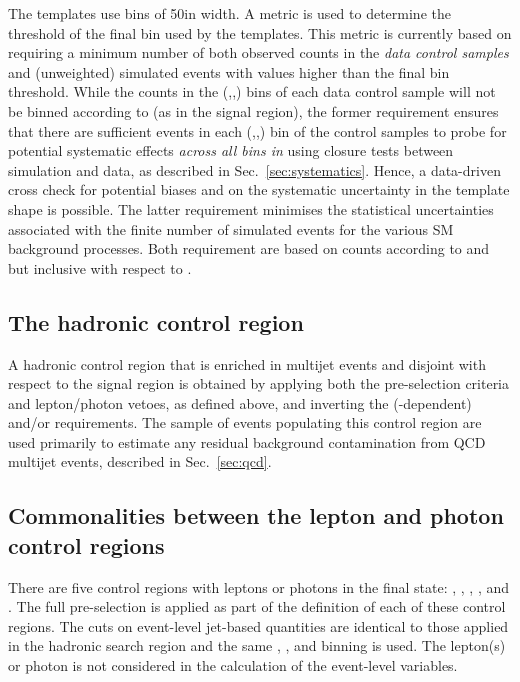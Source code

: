The templates use \mht bins of 50\gev in width. A metric is used to
determine the threshold of the final \mht bin used by the
templates. This metric is currently based on requiring a minimum
number of both observed counts in the {\it data control samples} and
(unweighted) simulated events with \mht values higher than the final
bin threshold. While the counts in the (\njet,\nb,\HT) bins of each
data control sample will not be binned according to \mht (as in the
signal region), the former requirement ensures that there are
sufficient events in each (\njet,\nb,\HT) bin of the control samples
to probe for potential systematic effects {\it across all bins in
  \mht} using closure tests between simulation and data, as described
in Sec.~\ref{sec:systematics}. Hence, a data-driven cross check for
potential biases and on the systematic uncertainty in the template
shape is possible. The latter requirement minimises the statistical
uncertainties associated with the finite number of simulated events
for the various SM background processes. Both requirement are based on
counts according to \njet and \nb but inclusive with respect to \nb.

\subsection{The hadronic control region}

A hadronic control region that is enriched in multijet events and
disjoint with respect to the signal region is obtained by applying
both the pre-selection criteria and lepton/photon vetoes, as defined
above, and inverting the (\HT-dependent) \alphat and/or \mhtmet
requirements. 
The sample of events populating this control region are used primarily
to estimate any residual background contamination from QCD multijet
events, described in Sec.~\ref{sec:qcd}.

\subsection{Commonalities between the lepton and photon control
  regions}

There are five control regions with leptons or photons in the final
state: \mj, \mmj, \ej, \eej, and \gj. The full pre-selection is
applied as part of the definition of each of these control
regions. The cuts on event-level jet-based quantities are identical to
those applied in the hadronic search region and the same \njet, \nb,
and \scalht binning is used. The lepton(s) or photon is not considered
in the calculation of the event-level variables.

